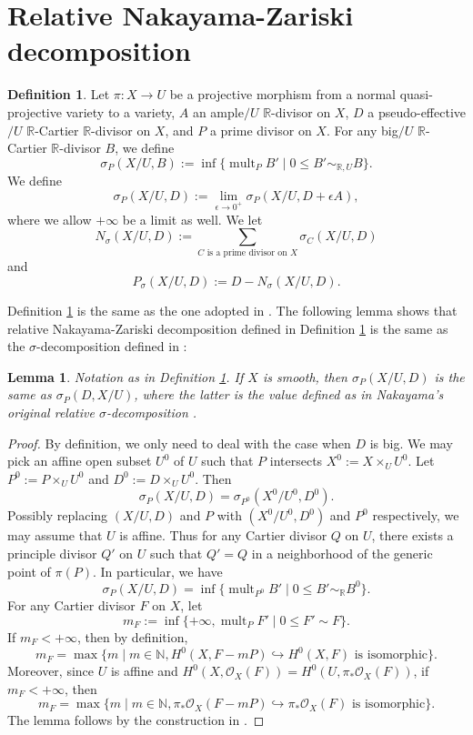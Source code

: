 \documentclass[11pt]{amsart}
\numberwithin{equation}{section}
\newcommand{\Rr}{\mathbb{R}}
\newcommand{\mult}{\operatorname{mult}}
\newtheorem{lem}[thm]{Lemma}
\theoremstyle{definition}
\newtheorem{defn}[thm]{Definition}
\theoremstyle{definition}
\theoremstyle{definition}
\begin{document}
\section{Relative Nakayama-Zariski decomposition}

\begin{defn}\label{defn: rel nz decomposition}
Let $\pi: X\rightarrow U$ be a projective morphism from a normal quasi-projective variety to a variety, $A$ an ample$/U$ $\Rr$-divisor on $X$, $D$ a pseudo-effective$/U$ $\Rr$-Cartier $\Rr$-divisor on $X$, and $P$ a prime divisor on $X$. For any big$/U$ $\Rr$-Cartier $\Rr$-divisor $B$, we define
$$\sigma_P(X/U,B):=\inf\{\mult_PB'\mid 0\leq B'\sim_{\Rr,U}B\}.$$
We define
$$\sigma_P(X/U,D):=\lim_{\epsilon\rightarrow0^+}\sigma_P(X/U,D+\epsilon A),$$
where we allow $+\infty$ be a limit as well. We let
$$N_{\sigma}(X/U,D):=\sum_{C\text{ is a prime divisor on }X}\sigma_C(X/U,D)$$
and
$$P_{\sigma}(X/U,D):=D-N_{\sigma}(X/U,D).$$
\end{defn}

Definition \ref{defn: rel nz decomposition} is the same as the one adopted in \cite{HX13,HMX18}. The following lemma shows that relative Nakayama-Zariski decomposition defined in Definition \ref{defn: rel nz decomposition} is the same as the $\sigma$-decomposition defined in \cite[III. \S 4.a]{Nak04}:

\begin{lem}\label{lem: nz decomposition definitions are equivalent}
Notation as in Definition \ref{defn: rel nz decomposition}. If $X$ is smooth, then $\sigma_P(X/U,D)$ is the same as $\sigma_P(D,X/U)$, where the latter is the value defined as in Nakayama's original relative $\sigma$-decomposition \cite[III. \S 4.a]{Nak04}. 
\end{lem}
\begin{proof}
By definition, we only need to deal with the case when $D$ is big. We may pick an affine open subset $U^0$ of $U$ such that $P$ intersects $X^0:=X\times_UU^0$. Let $P^0:=P\times_UU^0$ and $D^0:=D\times_UU^0$. Then
$$\sigma_P(X/U,D)=\sigma_{P^0}(X^0/U^0,D^0).$$
Possibly replacing $(X/U,D)$ and $P$ with $(X^0/U^0,D^0)$ and $P^0$ respectively, we may assume that $U$ is affine. Thus for any Cartier divisor $Q$ on $U$, there exists a principle divisor $Q'$ on $U$ such that $Q'=Q$ in a neighborhood of the generic point of $\pi(P)$. In particular, we have
$$\sigma_P(X/U,D)=\inf\{\mult_{P^0}B'\mid 0\leq B'\sim_{\Rr}B^0\}.$$
For any Cartier divisor $F$ on $X$, let
$$m_F:=\inf\{+\infty,\mult_PF'\mid 0\leq F'\sim F\}.$$
If $m_F<+\infty$, then by definition,
$$m_F=\max\{m\mid m\in\mathbb N, H^0(X,F-mP)\hookrightarrow H^0(X,F)\text{ is isomorphic}\}.$$
Moreover, since $U$ is affine and $H^0(X,\mathcal{O}_X(F))=H^0(U,\pi_*\mathcal{O}_X(F))$, if $m_F<+\infty$, then
$$m_F=\max\{m\mid m\in\mathbb N, \pi_*\mathcal{O}_X(F-mP)\hookrightarrow\pi_*\mathcal{O}_X(F)\text{ is isomorphic}\}.$$
The lemma follows by the construction in \cite[III. \S 4.a]{Nak04}.
\end{proof}
\end{document}
